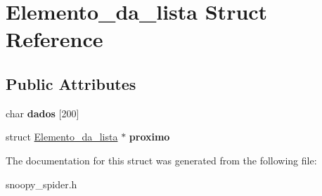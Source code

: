 \hypertarget{struct_elemento__da__lista}{}\section{Elemento\+\_\+da\+\_\+lista Struct Reference}
\label{struct_elemento__da__lista}
\subsection*{Public Attributes}
\begin{DoxyCompactItemize}
\item 
\mbox{\label{struct_elemento__da__lista_a4284e2e9464e7542bca0c0b77a3f4ea3}} 
char {\bfseries dados} \mbox{[}200\mbox{]}
\item 
\mbox{\label{struct_elemento__da__lista_a7ec74d45207feea06a20f3de4d6df924}} 
struct \mbox{\hyperlink{struct_elemento__da__lista}{Elemento\+\_\+da\+\_\+lista}} $\ast$ {\bfseries proximo}
\end{DoxyCompactItemize}


The documentation for this struct was generated from the following file\+:\begin{DoxyCompactItemize}
\item 
snoopy\+\_\+spider.\+h\end{DoxyCompactItemize}
